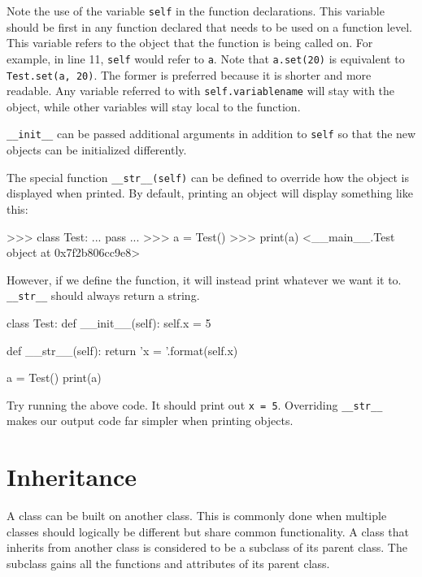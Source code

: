 \documentclass[11pt]{cselabheader}
\begin{document}
Note the use of the variable \lstinline{self} in the function declarations.
This variable should be first in any function declared that needs to be used on
a function level. This variable refers to the object that the function is
being called on. For example, in line 11, \lstinline{self} would refer to
\lstinline{a}. Note that \lstinline{a.set(20)} is equivalent to
\lstinline{Test.set(a, 20)}. The former is preferred because it is shorter and
more readable. Any variable referred to with \lstinline{self.variablename} will
stay with the object, while other variables will stay local to the function.

\lstinline{__init__} can be passed additional arguments in addition to
\lstinline{self} so that the new objects can be initialized differently.

The special function \lstinline{__str__(self)} can be defined to override
how the object is displayed when printed. By default, printing an object will
display something like this:

\begin{pyconcode}
>>> class Test:
...     pass
... 
>>> a = Test()
>>> print(a)
<__main__.Test object at 0x7f2b806cc9e8>
\end{pyconcode}

However, if we define the function, it will instead print whatever we want it
to. \lstinline{__str__} should always return a string.

\begin{python3code}
class Test:
    def __init__(self):
        self.x = 5

    def __str__(self):
        return 'x = {}'.format(self.x)

a = Test()
print(a)
\end{python3code}

Try running the above code. It should print out \lstinline{x = 5}. Overriding
\lstinline{__str__} makes our output code far simpler when printing objects.

\section{Inheritance}
\label{sec:inheritance}
A class can be built on another class. This is commonly done when multiple
classes should logically be different but share common functionality. A class
that inherits from another class is considered to be a subclass of its parent
class. The subclass gains all the functions and attributes of its parent class.
\end{document}
